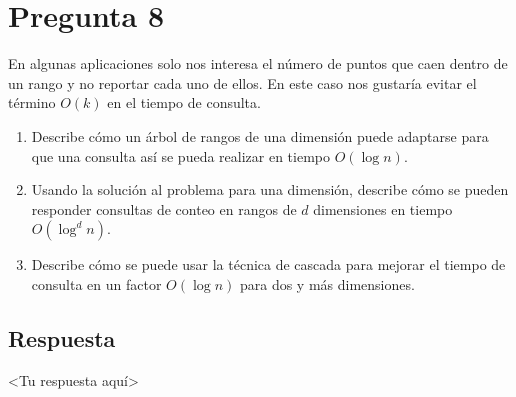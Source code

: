\section*{Pregunta 8}
\noindent En algunas aplicaciones solo nos interesa el número de puntos que caen dentro de un rango y no reportar cada uno de ellos.
En este caso nos gustaría evitar el término $O(k)$ en el tiempo de consulta.

\begin{enumerate}
  \item Describe cómo un árbol de rangos de una dimensión puede adaptarse para que una consulta así se pueda realizar en tiempo $O(\log n)$.
  \item Usando la solución al problema para una dimensión, describe cómo se pueden responder consultas de conteo en rangos de $d$ dimensiones en tiempo $O(\log^d n)$.
  \item Describe cómo se puede usar la técnica de cascada para mejorar el tiempo de consulta en un factor $O(\log n)$ para dos y más dimensiones.
\end{enumerate}

\subsection*{Respuesta}
<Tu respuesta aquí>

\bigskip
